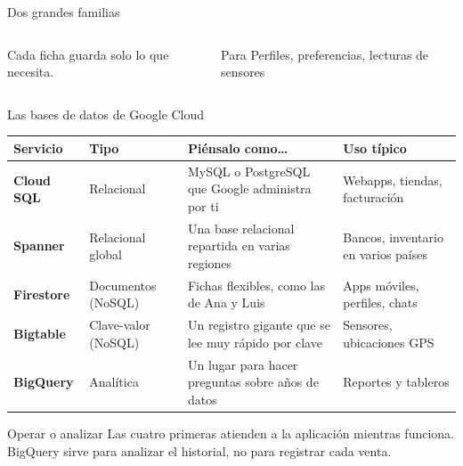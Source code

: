 \documentclass[aspectratio=169,10pt,c]{beamer}
\begin{document}
\begin{frame}{Dos grandes familias}
\begin{columns}[T,onlytextwidth]
\par\vspace{3mm}
{\small Cada ficha guarda solo lo que necesita.}\par\vspace{3mm}
\begin{exampleblock}{Para}
\small Perfiles, preferencias, lecturas de sensores
\end{exampleblock}
\end{columns}
\end{frame}

\begin{frame}{Las bases de datos de Google Cloud}
\renewcommand{\arraystretch}{1.3}
\centering\small
\begin{tabular}{@{}p{2.1cm}p{2.5cm}>{\raggedright\arraybackslash}p{4.3cm}>{\raggedright\arraybackslash}p{3.8cm}@{}}
\toprule
\textbf{Servicio} & \textbf{Tipo} & \textbf{Piénsalo como\ldots} & \textbf{Uso típico}\\
\midrule
\textbf{Cloud SQL} & Relacional & MySQL o PostgreSQL que Google administra por ti & Webapps, tiendas, facturación\\
\textbf{Spanner} & Relacional global & Una base relacional repartida en varias regiones & Bancos, inventario en varios países\\
\textbf{Firestore} & Documentos (NoSQL) & Fichas flexibles, como las de Ana y Luis & Apps móviles, perfiles, chats\\
\textbf{Bigtable} & Clave-valor (NoSQL) & Un registro gigante que se lee muy rápido por clave & Sensores, ubicaciones GPS\\
\textbf{BigQuery} & Analítica & Un lugar para hacer preguntas sobre años de datos & Reportes y tableros\\
\bottomrule
\end{tabular}
\par\vspace{3mm}
\begin{alertblock}{Operar o analizar}
\small Las cuatro primeras atienden a la aplicación mientras funciona. BigQuery sirve para analizar el historial, no para registrar cada venta.
\end{alertblock}
\end{frame}
\end{document}
